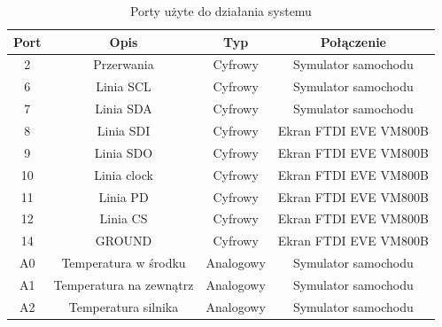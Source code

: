 \documentclass{xmgr}
\begin{document}
\begin{table}[!tbh]
\begin{tabular}{|c|c|c|c|} \hline
\textbf{Port} & \textbf{Opis} & \textbf{Typ} & \textbf{Połączenie} \\ \hline
	2 & Przerwania & Cyfrowy & Symulator samochodu\\ \hline
	6 & Linia SCL & Cyfrowy & Symulator samochodu\\ \hline
	7 & Linia SDA & Cyfrowy & Symulator samochodu\\ \hline
	8 & Linia SDI & Cyfrowy & Ekran FTDI EVE VM800B\\ \hline
	9 & Linia SDO & Cyfrowy & Ekran FTDI EVE VM800B\\ \hline
	10 & Linia clock & Cyfrowy & Ekran FTDI EVE VM800B\\ \hline
	11 & Linia PD & Cyfrowy & Ekran FTDI EVE VM800B\\ \hline
	12 & Linia CS & Cyfrowy & Ekran FTDI EVE VM800B\\ \hline
	14 & GROUND & Cyfrowy & Ekran FTDI EVE VM800B\\ \hline
	A0 & Temperatura w środku & Analogowy & Symulator samochodu\\ \hline
	A1 & Temperatura na zewnątrz & Analogowy & Symulator samochodu\\ \hline
	A2 & Temperatura silnika & Analogowy & Symulator samochodu\\ \hline
\end{tabular}
\caption{Porty użyte do działania systemu}
\end{table}
\end{document}

